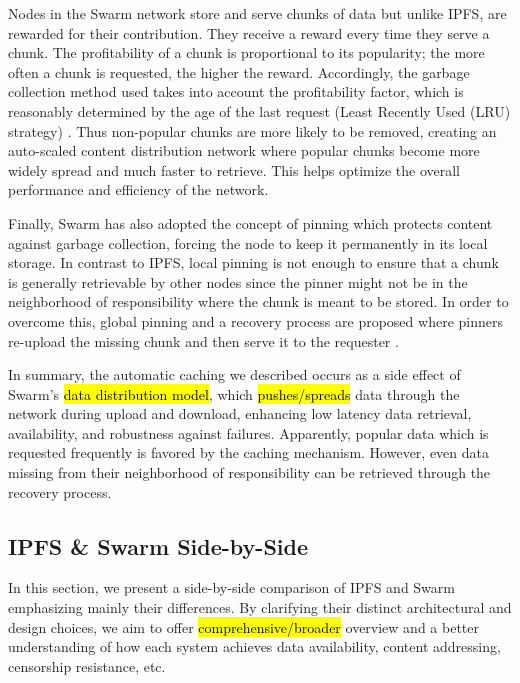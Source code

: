 Nodes in the Swarm network store and serve chunks of data but unlike IPFS, are rewarded for their contribution. They receive a reward every time they serve a chunk. The profitability of a chunk is proportional to its popularity; the more often a chunk is requested, the higher the reward. Accordingly, the garbage collection method used takes into account the profitability factor, which is reasonably determined by the age of the last request (Least Recently Used (LRU) strategy) \citep[p.~72]{tron_2020}. Thus non-popular chunks are more likely to be removed, creating an auto-scaled content distribution network \citep[p.~72]{tron_2020} where popular chunks become more widely spread and much faster to retrieve. This helps optimize the overall performance and efficiency of the network.

Finally, Swarm has also adopted the concept of pinning which protects content against garbage collection, forcing the node to keep it permanently in its local storage. In contrast to IPFS, local pinning is not enough to ensure that a chunk is generally retrievable by other nodes since the pinner might not be in the neighborhood of responsibility where the chunk is meant to be stored. In order to overcome this, global pinning and a recovery process are proposed where pinners re-upload the missing chunk and then serve it to the requester \citep[pp.~161--167]{tron_2020}.

In summary, the automatic caching we described occurs as a side effect of Swarm's \hl{data distribution model}, which \hl{pushes/spreads} data through the network during upload and download, enhancing low latency data retrieval, availability, and robustness against failures. Apparently, popular data which is requested frequently is favored by the caching mechanism. However, even data missing from their neighborhood of responsibility can be retrieved through the recovery process.

\subsection{IPFS \& Swarm Side-by-Side}\label{sec:ipfs_vs_swarm}
In this section, we present a side-by-side comparison of IPFS and Swarm emphasizing mainly their differences. By clarifying their distinct architectural and design choices, we aim to offer \hl{comprehensive/broader} overview and a better understanding of how each system achieves data availability, content addressing, censorship resistance, etc.

